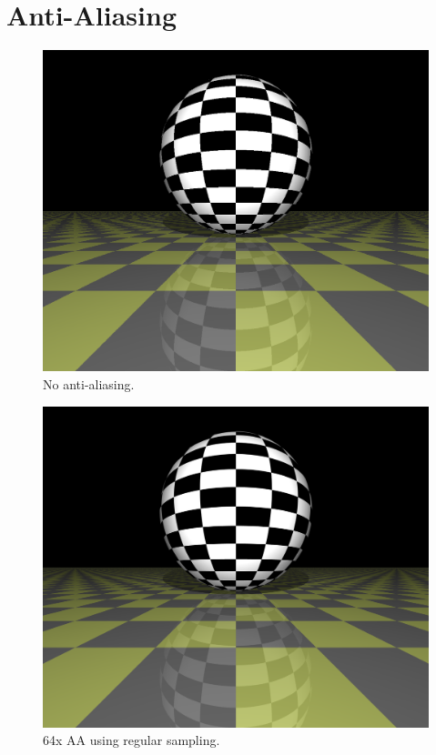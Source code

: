\documentclass{article}
\begin{document}
\section{Anti-Aliasing}

\begin{figure}[H]
    \includegraphics[width=\textwidth]{./examples/AntiAliasingComparison/Scene_noAntiAliasing.png}
    \caption{No anti-aliasing.}
\end{figure}

\begin{figure}[H]
    \includegraphics[width=\textwidth]{./examples/AntiAliasingComparison/Scene_regular64.png}
    \caption{64x AA using regular sampling.}
\end{figure}
\end{document}

